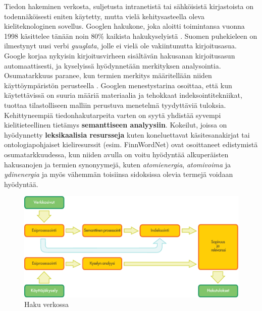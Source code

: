 \begin{multicols}{2}
Tiedon hakeminen verkosta, suljetusta intranetistä tai sähköisistä
kirjastoista on todennäköisesti eniten käytetty, mutta
vielä kehitysasteella oleva kieliteknologinen sovellus. Googlen
hakukone, joka aloitti toimintansa vuonna 1998 käsittelee tänään noin
80\% kaikista hakukyselyistä \cite{spi1}. Suomen puhekieleen on
ilmestynyt uusi verbi \textit{guuglata}, jolle ei vielä
ole vakiintunutta kirjoitusasua. Google korjaa nykyisin kirjoitusvirheen
sisältävän hakusanan kirjoitusasun automaattisesti, ja kyselyissä hyödynnetään
merkityksen analysointia. Osumatarkkuus paranee, kun termien 
merkitys määritellään niiden käyttöympäristön perusteella \cite{Google-rolls}. 
Googlen menestystarina osoittaa, että kun käytettävissä on suuria määriä 
materiaalia ja tehokkaat indeksointitekniikat, tuottaa tilastolliseen malliin
perustuva menetelmä tyydyttäviä tuloksia.\\
Kehittyneempiä tiedonhakutarpeita varten on syytä yhdistää
syvempi kielitieteellinen tietämys \textbf{semanttiseen analyysiin}.
Kokeilut, joissa on hyödynnetty \textbf{leksikaalisia resursseja} kuten koneluettavat
käsitesanakirjat tai ontologiapohjaiset kieliresurssit
(esim. FinnWordNet) ovat osoittaneet edistymistä osumatarkkuudessa, kun niiden 
avulla on voitu hyödyntää alkuperäisten hakusanojen ja termien synonyymejä, kuten
\textit{atomienergia},
\textit{atomivoima} ja
\textit{ydinenergia}
ja myös vähemmän toisiinsa sidoksissa olevia termejä
voidaan hyödyntää.

\begin{figure}[htb]
  \center
  \includegraphics[width=\textwidth]{../_media/finnish/web_search_architecture}
  \caption{Haku verkossa}
  \label{fig:websearcharch-fin}
 \end{figure}



\end{multicols}
